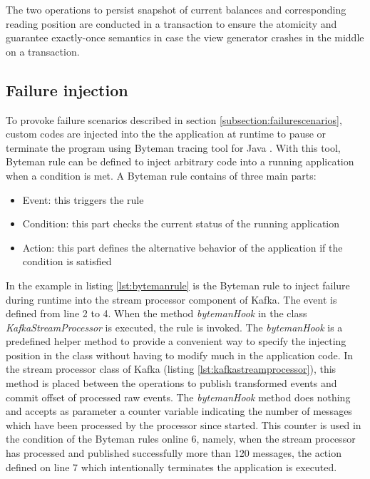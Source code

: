 The two operations to persist snapshot of current balances and corresponding reading position are conducted in a transaction to ensure the atomicity and guarantee exactly-once semantics in case the view generator crashes in the middle on a transaction.

\subsection{Failure injection}
To provoke failure scenarios described in section \ref{subsection:failurescenarios}, custom codes are injected into the the application at runtime to pause or terminate the program using Byteman tracing tool for Java \cite{byteman}. With this tool, Byteman rule can be defined to inject arbitrary code into a running application when a condition is met. A Byteman rule contains of three main parts: 
\begin{itemize}
	\item Event: this triggers the rule
	\item Condition: this part checks the current status of the running application
	\item Action: this part defines the alternative behavior of the application if the condition is satisfied
\end{itemize}


 

In the example in listing \ref{lst:bytemanrule} is the Byteman rule to inject failure during runtime into the stream processor component of Kafka. The event is defined from line 2 to 4. When the method \emph{bytemanHook} in the class \emph{KafkaStreamProcessor} is executed, the rule is invoked. The \emph{bytemanHook} is a predefined helper method to provide a convenient way to specify the injecting position in the class without having to modify much in the application code. In the stream processor class of Kafka (listing \ref{lst:kafkastreamprocessor}), this method is placed between the operations to publish transformed events and commit offset of processed raw events. The \emph{bytemanHook} method does nothing and accepts as parameter a counter variable indicating the number of messages which have been processed by the processor since started. This counter is used in the condition of the Byteman rules online 6, namely, when the stream processor has processed and published successfully more than 120 messages, the action defined on line 7 which intentionally terminates the application is executed.

